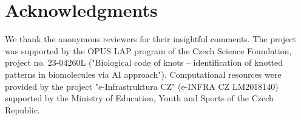 \documentclass{article}
\begin{document}
\section*{Acknowledgments}
We thank the anonymous reviewers for their insightful comments. The project was supported by the OPUS LAP program of the Czech Science Foundation, project no. 23-04260L ("Biological code of knots – identification of knotted patterns in biomolecules via AI approach"). Computational resources were provided by the project "e-Infrastruktura CZ" (e-INFRA CZ LM2018140) supported by the Ministry of Education, Youth and Sports of the Czech Republic.



\end{document}
